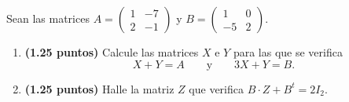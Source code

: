 
Sean las matrices $A=\begin{pmatrix}1&-7\\2&-1\end{pmatrix}$ y $B=\begin{pmatrix}1&0\\-5&2\end{pmatrix}$.
\begin{enumerate}[label=\alph*)]
\item \textbf{(1.25 puntos)} Calcule las matrices $X$ e $Y$ para las que se verifica
\[
X+Y=A\qquad\text{y}\qquad3X+Y=B.
\]
\item \textbf{(1.25 puntos)} Halle la matriz $Z$ que verifica $B\cdot Z+B^t=2I_2$.
\end{enumerate}
